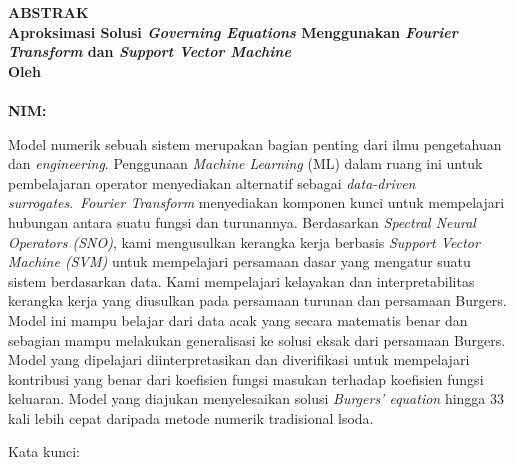 \clearpage
{}
\begin{center}
\textbf{\large  ABSTRAK}\\[0.5cm]
\textbf{\large Aproksimasi Solusi \textit{Governing Equations} Menggunakan \emph{Fourier Transform} dan \textit{Support Vector Machine}}\\[0.5cm]
\textbf{Oleh}\\
\textbf{\penulis}\\
\textbf{NIM:\@\nim}\\[2em]
\end{center}

\noindent Model numerik sebuah sistem merupakan bagian penting dari ilmu pengetahuan dan \textit{engineering}. Penggunaan \textit{Machine Learning} (ML) dalam ruang ini untuk pembelajaran operator menyediakan alternatif sebagai \textit{data-driven surrogates}.\ \textit{Fourier Transform} menyediakan komponen kunci untuk mempelajari hubungan antara suatu fungsi dan turunannya. Berdasarkan \textit{Spectral Neural Operators (SNO)}, kami mengusulkan kerangka kerja berbasis \textit{Support Vector Machine (SVM)} untuk mempelajari persamaan dasar yang mengatur suatu sistem berdasarkan data. Kami mempelajari kelayakan dan interpretabilitas kerangka kerja yang diusulkan pada persamaan turunan dan persamaan Burgers. Model ini mampu belajar dari data acak yang secara matematis benar dan sebagian mampu melakukan generalisasi ke solusi eksak dari persamaan Burgers. Model yang dipelajari diinterpretasikan dan diverifikasi untuk mempelajari kontribusi yang benar dari koefisien fungsi masukan terhadap koefisien fungsi keluaran. Model yang diajukan menyelesaikan solusi \textit{Burgers' equation} hingga 33 kali lebih cepat daripada metode numerik tradisional lsoda.




\noindent Kata kunci: \katakunci{}
